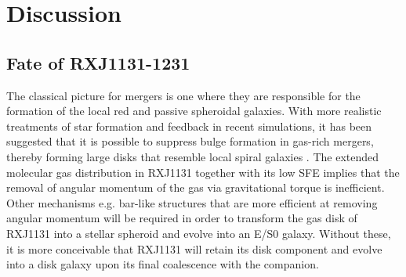 \documentclass[]{emulateapj}
\begin{document}
\section{Discussion} \label{sec:diss}
\subsection{Fate of RXJ1131-1231}
The classical picture for mergers is one where they are responsible for the formation of the local
red and passive spheroidal galaxies.
With more realistic treatments of star formation and feedback in recent simulations,
it has been suggested that it is possible to suppress bulge formation
in gas-rich mergers, thereby forming large disks 
that resemble local spiral galaxies \citep{Springel05a, Robertson06a, Hopkins09a}.
%
%
The extended molecular gas distribution in RXJ1131 together with its low SFE implies that the 
removal of angular momentum of the gas via gravitational torque is inefficient.
Other mechanisms e.g. bar-like structures that are more efficient at removing angular momentum will 
be required in order to transform the gas disk of RXJ1131 into a stellar spheroid and evolve into 
an E/S0 galaxy. Without these, it is more conceivable that RXJ1131 will retain its disk component and
evolve into a disk galaxy upon its final coalescence with the companion.
\end{document}
